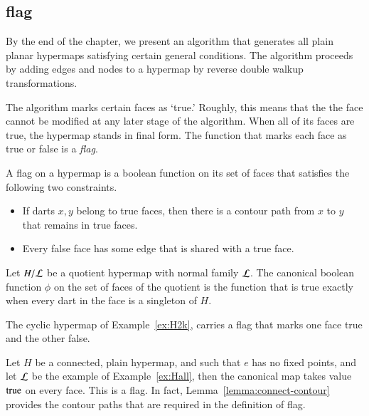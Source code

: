 \subsection{flag}

By the end of the chapter, we present an algorithm that
generates all plain planar hypermaps satisfying certain general
conditions.   The algorithm  proceeds by adding edges and nodes to a hypermap by reverse double walkup transformations.

The algorithm  marks certain faces as `true.'
Roughly, this  means that the the face cannot be modified
at any later stage of the algorithm.   When all of its faces
are true, the hypermap stands in final form.
The function that marks each face as true or false is a
{\it flag}.


\begin{definition}[flag]  A flag on a hypermap
is a boolean function on its set of faces 
that satisfies the following two
constraints.
\begin{itemize}
    \item If darts $x,y$ belong to true faces,
    then there is a contour path from $x$ to $y$ that remains
    in true faces.
    \item Every false face has some edge that is shared with a true face.
    \end{itemize}
\end{definition}

\begin{example} Let $H/{\cal L}$ be a quotient hypermap with
normal family $\cal L$.  The canonical boolean function
$\phi$ on the set of faces of the quotient is the function that
is true exactly when every dart in
the face is a singleton of $H$.
\end{example}

\begin{example} The cyclic hypermap of Example~\ref{ex:H2k}, carries a flag that marks one face true and the other false.
\end{example}

\begin{example} Let $H$ be a connected, plain hypermap, and such that $e$ has no fixed points, and let $\cal L$ be the example of Example~\ref{ex:Hall}, then the canonical map takes value ${\operatorname{true}}$ on every face.  This is a flag. In fact, Lemma~\ref{lemma:connect-contour} provides the contour paths that are required in the definition of flag.
\end{example}

